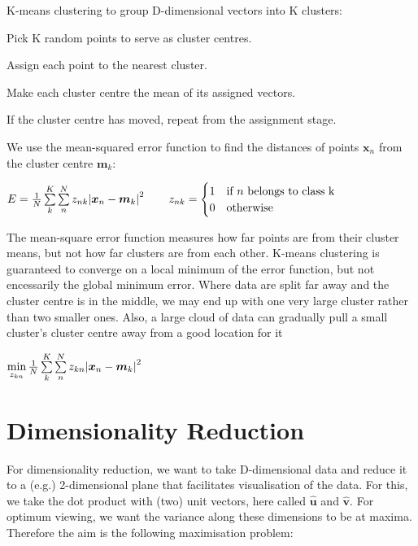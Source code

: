\documentclass[10pt,a4paper]{article}
\newcommand{\bh}[1]{\bm{\hat{#1}}}
\newcommand{\su}[2]{\sum\limits_{#1}^{#2}}
\newcommand{\re}[1]{\frac{1}{#1}}
\begin{document}
		K-means clustering to group D-dimensional vectors into K clusters:\newline
		
		Pick K random points to serve as cluster centres.
		
		Assign each point to the nearest cluster.
		
		Make each cluster centre the mean of its assigned vectors.
		
		If the cluster centre has moved, repeat from the assignment stage. \newline
		
		We use the mean-squared error function to find the distances of points $\bm x_n$ from the cluster centre $\bm m_k$:
		
		\begin{center}
			$
				E = \re N \su{k}{K} \su{n}{N} z_{nk} \abs{ \bm x_n - \bm m_k}^2 \quad \quad z_{nk}
				= \begin{cases} 1 & \mbox{if } n\mbox{ belongs to class k} \\ 0 & \mbox{otherwise} \end{cases}
			$
			
		\end{center}

		The mean-square error function measures how far points are from their cluster means, but not how far clusters are from each other. K-means clustering is guaranteed to converge on a local minimum of the error function, but not encessarily the global minimum error. Where data are split far away and the cluster centre is in the middle, we may end up with one very large cluster rather than two smaller ones. Also, a large cloud of data can gradually pull a small cluster's cluster centre away from a good location for it 
	\begin{center}
		$
			\min\limits_{z_{kn}} \frac{1}{N} \sum\limits_k^K\sum\limits_n^N z_{kn}\abs{\bm x_n - \bm m_k}^2
		$
	\end{center}
	
	\section{Dimensionality Reduction}
	
	For dimensionality reduction, we want to take D-dimensional data and reduce it to a (e.g.) 2-dimensional plane that facilitates visualisation of the data. For this, we take the dot product with (two) unit vectors, here called $\bh u$ and $\bh v$. For optimum viewing, we want the variance along these dimensions to be at maxima. Therefore the aim is the following maximisation problem:
	
\end{document}
